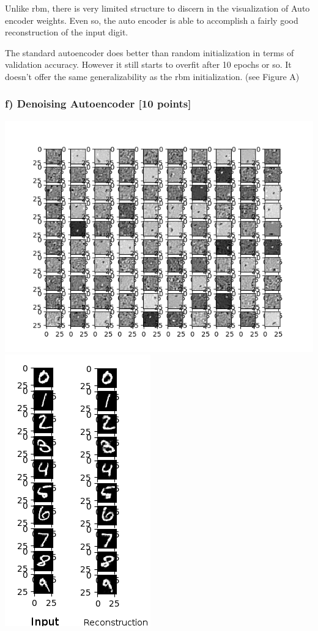 \documentclass[10pt]{article}
\begin{document}
Unlike rbm, there is very limited structure to discern in the visualization of Auto encoder weights. Even so, the auto encoder is able to accomplish a fairly good reconstruction of the input digit.


The standard autoencoder does better than random initialization in terms of validation accuracy. However it still starts to overfit after 10 epochs or so. It doesn't offer the same generalizability as the rbm initialization. (see Figure A)
 

\subsubsection*{f) Denoising Autoencoder [10 points]}

\includegraphics[scale=0.7]{ae_dropout_weights.png}
\includegraphics[scale=0.7]{ae_dropout_recon.png}
\end{document}
